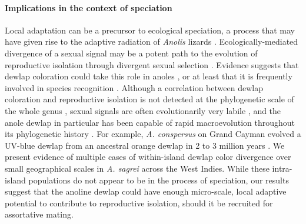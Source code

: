 \paragraph{Implications in the context of speciation} Local adaptation can be a precursor to ecological speciation, a process that may have given rise to the adaptive radiation of \textit{Anolis} lizards \citep{Harmon2003, Gavrilets2009}. Ecologically-mediated divergence of a sexual signal may be a potent path to the evolution of reproductive isolation through divergent sexual selection \citep{Reynolds2007, Servedio2011}. Evidence suggests that dewlap coloration could take this role in anoles \citep{Ng2011, Lambert2013, Geneva2015, Ng2017}, or at least that it is frequently involved in species recognition \citep{Williams1969, Williams1977, Losos1985, Macedonia1994, Fleishman2000, Macedonia2013, Ingram2016, Baeckens2018}. Although a correlation between dewlap coloration and reproductive isolation is not detected at the phylogenetic scale of the whole genus \citep{Nicholson2007, Harrison2012, Ingram2016}, sexual signals are often evolutionarily very labile \citep{Kraaijeveld2011}, and the anole dewlap in particular has been capable of rapid macroevolution throughout its phylogenetic history \citep{Nicholson2007}. For example, \textit{A. conspersus} on Grand Cayman evolved a UV-blue dewlap from an ancestral orange dewlap in 2 to 3 million years \citep{Macedonia2001}. We present evidence of multiple cases of within-island dewlap color divergence over small geographical scales in \textit{A. sagrei} across the West Indies. While these intra-island populations do not appear to be in the process of speciation, our results suggest that the anoline dewlap could have enough micro-scale, local adaptive potential to contribute to reproductive isolation, should it be recruited for assortative mating.